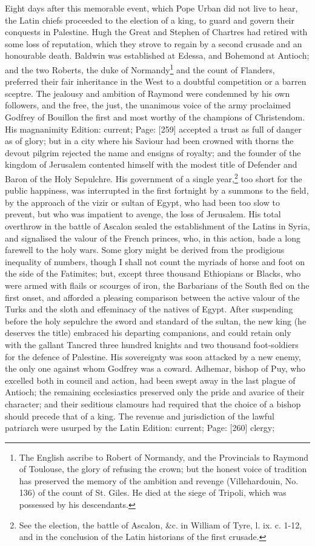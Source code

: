 Eight days after this memorable event, which Pope Urban did not live to hear, the Latin chiefs proceeded to the election of a king, to guard and govern their conquests in Palestine. Hugh the Great and Stephen of Chartres had retired with some loss of reputation, which they strove to regain by a second crusade and an honourable death. Baldwin was established at Edessa, and Bohemond at Antioch; and the two Roberts, the duke of Normandy\footnote{The English ascribe to Robert of Normandy, and the Provincials to Raymond of Toulouse, the glory of refusing the crown; but the honest voice of tradition has preserved the memory of the ambition and revenge (Villehardouin, No. 136) of the count of St. Giles. He died at the siege of Tripoli, which was possessed by his descendants.} and the count of Flanders, preferred their fair inheritance in the West to a doubtful competition or a barren sceptre. The jealousy and ambition of Raymond were condemned by his own followers, and the free, the just, the unanimous voice of the army proclaimed Godfrey of Bouillon the first and most worthy of the champions of Christendom. His magnanimity Edition: current; Page: [259] accepted a trust as full of danger as of glory; but in a city where his Saviour had been crowned with thorns the devout pilgrim rejected the name and ensigns of royalty; and the founder of the kingdom of Jerusalem contented himself with the modest title of Defender and Baron of the Holy Sepulchre. His government of a single year,\footnote{See the election, the battle of Ascalon, \&c. in William of Tyre, l. ix. c. 1-12, and in the conclusion of the Latin historians of the first crusade.} too short for the public happiness, was interrupted in the first fortnight by a summons to the field, by the approach of the vizir or sultan of Egypt, who had been too slow to prevent, but who was impatient to avenge, the loss of Jerusalem. His total overthrow in the battle of Ascalon sealed the establishment of the Latins in Syria, and signalised the valour of the French princes, who, in this action, bade a long farewell to the holy wars. Some glory might be derived from the prodigious inequality of numbers, though I shall not count the myriads of horse and foot on the side of the Fatimites; but, except three thousand Ethiopians or Blacks, who were armed with flails or scourges of iron, the Barbarians of the South fled on the first onset, and afforded a pleasing comparison between the active valour of the Turks and the sloth and effeminacy of the natives of Egypt. After suspending before the holy sepulchre the sword and standard of the sultan, the new king (he deserves the title) embraced his departing companions, and could retain only with the gallant Tancred three hundred knights and two thousand foot-soldiers for the defence of Palestine. His sovereignty was soon attacked by a new enemy, the only one against whom Godfrey was a coward. Adhemar, bishop of Puy, who excelled both in council and action, had been swept away in the last plague of Antioch; the remaining ecclesiastics preserved only the pride and avarice of their character; and their seditious clamours had required that the choice of a bishop should precede that of a king. The revenue and jurisdiction of the lawful patriarch were usurped by the Latin Edition: current; Page: [260] clergy; 